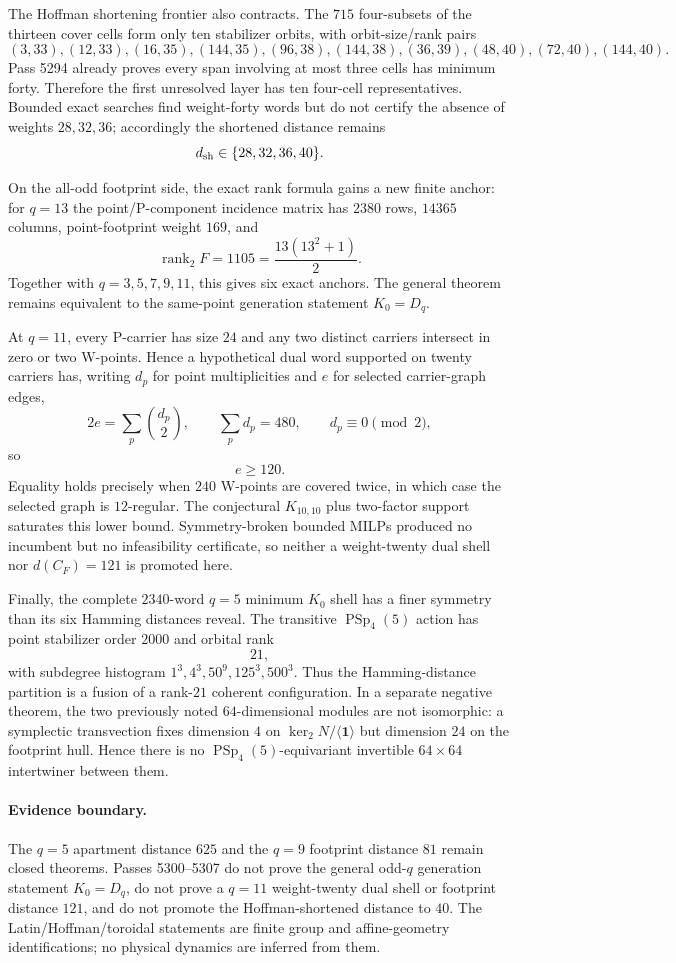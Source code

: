 The Hoffman shortening frontier also contracts.  The $715$ four-subsets of the
thirteen cover cells form only ten stabilizer orbits, with orbit-size/rank pairs
\[
 (3,33),(12,33),(16,35),(144,35),(96,38),(144,38),
 (36,39),(48,40),(72,40),(144,40).
\]
Pass 5294 already proves every span involving at most three cells has minimum
forty.  Therefore the first unresolved layer has ten four-cell representatives.
Bounded exact searches find weight-forty words but do not certify the absence of
weights $28,32,36$; accordingly the shortened distance remains
\[
 d_{\rm sh}\in\{28,32,36,40\}.
\]

On the all-odd footprint side, the exact rank formula gains a new finite anchor:
for $q=13$ the point/P-component incidence matrix has $2380$ rows, $14365$
columns, point-footprint weight $169$, and
\[
 \operatorname{rank}_2F=1105=\frac{13(13^2+1)}2.
\]
Together with $q=3,5,7,9,11$, this gives six exact anchors.  The general theorem
remains equivalent to the same-point generation statement $K_0=D_q$.

At $q=11$, every P-carrier has size $24$ and any two distinct carriers intersect
in zero or two W-points.  Hence a hypothetical dual word supported on twenty
carriers has, writing $d_p$ for point multiplicities and $e$ for selected
carrier-graph edges,
\[
 2e=\sum_p\binom{d_p}{2},\qquad \sum_p d_p=480,\qquad d_p\equiv0\pmod2,
\]
so
\[
 \boxed{e\ge120}.
\]
Equality holds precisely when $240$ W-points are covered twice, in which case the
selected graph is $12$-regular.  The conjectural $K_{10,10}$ plus two-factor
support saturates this lower bound.  Symmetry-broken bounded MILPs produced no
incumbent but no infeasibility certificate, so neither a weight-twenty dual shell
nor $d(C_F)=121$ is promoted here.

Finally, the complete $2340$-word $q=5$ minimum $K_0$ shell has a finer symmetry
than its six Hamming distances reveal.  The transitive $\operatorname{PSp}_4(5)$
action has point stabilizer order $2000$ and orbital rank
\[
 \boxed{21},
\]
with subdegree histogram $1^3,4^3,50^9,125^3,500^3$.  Thus the Hamming-distance
partition is a fusion of a rank-$21$ coherent configuration.  In a separate
negative theorem, the two previously noted $64$-dimensional modules are not
isomorphic: a symplectic transvection fixes dimension $4$ on
$\ker_2N/\langle\mathbf1\rangle$ but dimension $24$ on the footprint hull.  Hence
there is no $\operatorname{PSp}_4(5)$-equivariant invertible $64\times64$
intertwiner between them.

\paragraph{Evidence boundary.}
The $q=5$ apartment distance $625$ and the $q=9$ footprint distance $81$ remain
closed theorems.  Passes 5300--5307 do not prove the general odd-$q$ generation
statement $K_0=D_q$, do not prove a $q=11$ weight-twenty dual shell or footprint
distance $121$, and do not promote the Hoffman-shortened distance to $40$.
The Latin/Hoffman/toroidal statements are finite group and affine-geometry
identifications; no physical dynamics are inferred from them.
